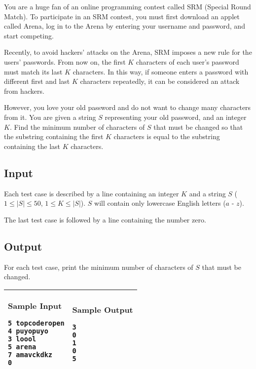 You are a huge fan of an online programming contest called SRM (Special Round
Match). To participate in an SRM contest, you must first download an
applet called Arena, log in to the Arena by entering your username and password,
and start competing.

Recently, to avoid hackers' attacks on the Arena, SRM imposes a new rule for the
users' passwords. From now on, the first $K$ characters of each user's password
must match its last $K$ characters. In this way, if someone enters a password with
different first and last $K$ characters repeatedly, it can be considered an attack
from hackers.

However, you love your old password and do not want to change many characters
from it. You are given a string $S$ representing your old password, and
an integer $K$. Find the minimum number of characters of $S$ that must be
changed so that the substring containing the first $K$ characters is
equal to the substring containing the last $K$ characters.

\subsection*{Input}

Each test case is described by a line containing an integer $K$ and a string $S$
($1 \leq |S| \leq 50$, $1 \leq K \leq |S|$). $S$ will contain only lowercase
English letters ($a$ - $z$).

The last test case is followed by a line containing the number zero.

\subsection*{Output}

For each test case, print the minimum number of characters of $S$ that must be
changed.

\begin{table}[!h]
\centering
\begin{tabular}{|l|l|}
\hline
\begin{minipage}[t]{3in}
\textbf{Sample Input}
\begin{verbatim}
5 topcoderopen
4 puyopuyo
3 loool
5 arena
7 amavckdkz
0
\end{verbatim}
\vspace{1mm}
\end{minipage}
&

\begin{minipage}[t]{3in}
\textbf{Sample Output}
\begin{verbatim}
3
0
1
0
5
\end{verbatim}
\vspace{1mm}
\end{minipage} \\
\hline
\end{tabular}
\end{table}

\newpage
